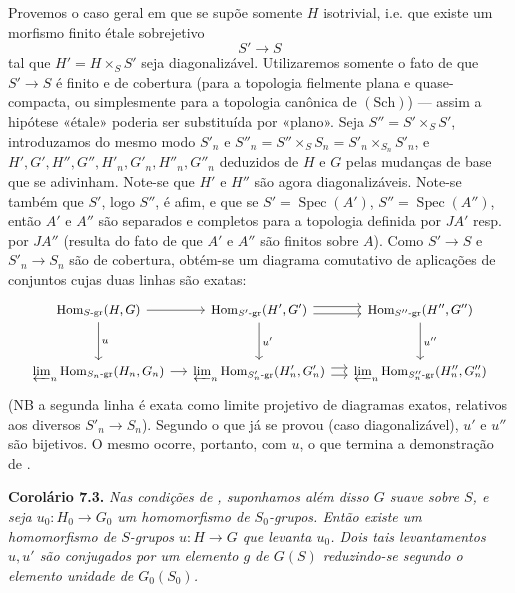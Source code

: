 Provemos o caso geral em que se supõe somente \(H\)
isotrivial, i.e. que existe um morfismo finito étale
sobrejetivo
\[
  S'\longrightarrow S
\]
tal que \(H'=H\times_SS'\) seja diagonalizável.
Utilizaremos somente o fato de que \(S'\to S\) é finito
e de cobertura (para a topologia fielmente plana e
quase-compacta, ou simplesmente para a topologia
canônica de \((\mathrm{Sch})\)) --- assim a hipótese
«étale» poderia ser substituída por «plano». Seja
\(S''=S'\times_SS'\), introduzamos do mesmo modo
\(S'_n\) e \(S''_n=S''\times_SS_n=S'_n\times_{S_n}S'_n\),
e \(H',G',H'',G'',H'_n,G'_n,H''_n,G''_n\) deduzidos de
\(H\) e \(G\) pelas mudanças de base que se adivinham.
Note-se que \(H'\) e \(H''\) são agora diagonalizáveis.
Note-se também que \(S'\), logo \(S''\), é afim, e que
se \(S'=\operatorname{Spec}(A')\),
\(S''=\operatorname{Spec}(A'')\), então \(A'\) e \(A''\)
são separados e completos para a topologia definida por
\(JA'\) resp. por \(JA''\) (resulta do fato de que \(A'\)
e \(A''\) são finitos sobre \(A\)). Como \(S'\to S\) e
\(S'_n\to S_n\) são de cobertura, obtém-se um diagrama
comutativo de aplicações de conjuntos cujas duas
linhas são exatas:
\[
\begin{tikzcd}[
  column sep=small,
  row sep=large,
  cells={nodes={font=\small}}
]
  \operatorname{Hom}_{S\text{-}\mathrm{gr}}(H,G)
    \arrow[r]
    \arrow[d,"u"]
  & \operatorname{Hom}_{S'\text{-}\mathrm{gr}}(H',G')
    \arrow[r,shift left=.6ex]
    \arrow[r,shift right=.6ex]
    \arrow[d,"u'"]
  & \operatorname{Hom}_{S''\text{-}\mathrm{gr}}(H'',G'')
    \arrow[d,"u''"]
  \\
  \varprojlim_n
    \operatorname{Hom}_{S_n\text{-}\mathrm{gr}}(H_n,G_n)
    \arrow[r]
  & \varprojlim_n
    \operatorname{Hom}_{S'_n\text{-}\mathrm{gr}}(H'_n,G'_n)
    \arrow[r,shift left=.6ex]
    \arrow[r,shift right=.6ex]
  & \varprojlim_n
    \operatorname{Hom}_{S''_n\text{-}\mathrm{gr}}(H''_n,G''_n)
\end{tikzcd}
\]
(NB a segunda linha é exata como limite projetivo de
diagramas exatos, relativos aos diversos \(S'_n\to S_n\)).
Segundo o que já se provou (caso diagonalizável), \(u'\)
e \(u''\) são bijetivos. O mesmo ocorre, portanto, com
\(u\), o que termina a demonstração de
.

\medskip
\noindent{}\textbf{Corolário 7.3.}
\textit{Nas condições de
, suponhamos além
disso \(G\) suave sobre \(S\), e seja \(u_0:H_0\to G_0\)
um homomorfismo de \(S_0\)-grupos. Então existe um
homomorfismo de \(S\)-grupos \(u:H\to G\) que levanta
\(u_0\). Dois tais levantamentos \(u,u'\) são conjugados
por um elemento \(g\) de \(G(S)\) reduzindo-se segundo
o elemento unidade de \(G_0(S_0)\).}

